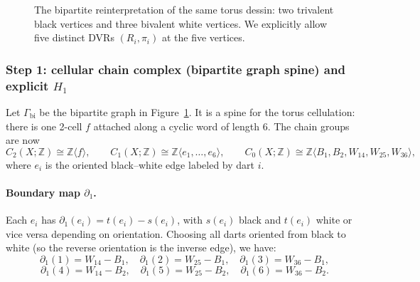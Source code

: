 \documentclass[11pt,oneside]{amsbook}
\numberwithin{equation}{section}
\theoremstyle{plain}
\theoremstyle{definition}
\theoremstyle{remark}
\newcommand{\Z}{\mathbb{Z}}
\begin{document}
\begin{figure}[t]
\centering
{}
\caption{The bipartite reinterpretation of the same torus dessin: two trivalent black vertices and three bivalent white vertices. We explicitly allow five distinct DVRs $(R_i,\pi_i)$ at the five vertices.}
\label{fig:bipartite_torus_dessin}
\end{figure}

\subsubsection{Step 1: cellular chain complex (bipartite graph spine) and explicit $H_1$}

Let $\Gamma_{\mathrm{bi}}$ be the bipartite graph in Figure~\ref{fig:bipartite_torus_dessin}.
It is a spine for the torus cellulation: there is one 2-cell $f$ attached along a cyclic word of length $6$.
The chain groups are now
\[
C_2(X;\Z)\cong \Z\langle f\rangle,\qquad 
C_1(X;\Z)\cong \Z\langle e_1,\dots,e_6\rangle,\qquad 
C_0(X;\Z)\cong \Z\langle B_1,B_2,W_{14},W_{25},W_{36}\rangle,
\]
where $e_i$ is the oriented black--white edge labeled by dart $i$.

\paragraph{Boundary map $\partial_1$.}
Each $e_i$ has $\partial_1(e_i)=t(e_i)-s(e_i)$, with $s(e_i)$ black and $t(e_i)$ white or vice versa depending on orientation.
Choosing all darts oriented from black to white (so the reverse orientation is the inverse edge), we have:
\[
\partial_1(1)=W_{14}-B_1,\quad \partial_1(2)=W_{25}-B_1,\quad \partial_1(3)=W_{36}-B_1,
\]
\[
\partial_1(4)=W_{14}-B_2,\quad \partial_1(5)=W_{25}-B_2,\quad \partial_1(6)=W_{36}-B_2.
\]
\end{document}
